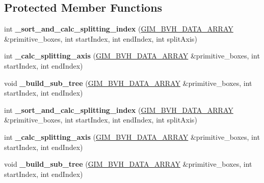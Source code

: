 \subsection*{Protected Member Functions}
\begin{DoxyCompactItemize}
\item 
\mbox{\label{classbtBvhTree_adab83b12f4b402cfb5993229464bb5bf}} 
int {\bfseries \+\_\+sort\+\_\+and\+\_\+calc\+\_\+splitting\+\_\+index} (\hyperlink{classGIM__BVH__DATA__ARRAY}{G\+I\+M\+\_\+\+B\+V\+H\+\_\+\+D\+A\+T\+A\+\_\+\+A\+R\+R\+AY} \&primitive\+\_\+boxes, int start\+Index, int end\+Index, int split\+Axis)
\item 
\mbox{\label{classbtBvhTree_a0a4c7b8aac4746d61db57943813897ae}} 
int {\bfseries \+\_\+calc\+\_\+splitting\+\_\+axis} (\hyperlink{classGIM__BVH__DATA__ARRAY}{G\+I\+M\+\_\+\+B\+V\+H\+\_\+\+D\+A\+T\+A\+\_\+\+A\+R\+R\+AY} \&primitive\+\_\+boxes, int start\+Index, int end\+Index)
\item 
\mbox{\label{classbtBvhTree_a04dbb29969ae7bdedc06d650b5f35932}} 
void {\bfseries \+\_\+build\+\_\+sub\+\_\+tree} (\hyperlink{classGIM__BVH__DATA__ARRAY}{G\+I\+M\+\_\+\+B\+V\+H\+\_\+\+D\+A\+T\+A\+\_\+\+A\+R\+R\+AY} \&primitive\+\_\+boxes, int start\+Index, int end\+Index)
\item 
\mbox{\label{classbtBvhTree_adab83b12f4b402cfb5993229464bb5bf}} 
int {\bfseries \+\_\+sort\+\_\+and\+\_\+calc\+\_\+splitting\+\_\+index} (\hyperlink{classGIM__BVH__DATA__ARRAY}{G\+I\+M\+\_\+\+B\+V\+H\+\_\+\+D\+A\+T\+A\+\_\+\+A\+R\+R\+AY} \&primitive\+\_\+boxes, int start\+Index, int end\+Index, int split\+Axis)
\item 
\mbox{\label{classbtBvhTree_a0a4c7b8aac4746d61db57943813897ae}} 
int {\bfseries \+\_\+calc\+\_\+splitting\+\_\+axis} (\hyperlink{classGIM__BVH__DATA__ARRAY}{G\+I\+M\+\_\+\+B\+V\+H\+\_\+\+D\+A\+T\+A\+\_\+\+A\+R\+R\+AY} \&primitive\+\_\+boxes, int start\+Index, int end\+Index)
\item 
\mbox{\label{classbtBvhTree_a04dbb29969ae7bdedc06d650b5f35932}} 
void {\bfseries \+\_\+build\+\_\+sub\+\_\+tree} (\hyperlink{classGIM__BVH__DATA__ARRAY}{G\+I\+M\+\_\+\+B\+V\+H\+\_\+\+D\+A\+T\+A\+\_\+\+A\+R\+R\+AY} \&primitive\+\_\+boxes, int start\+Index, int end\+Index)
\end{DoxyCompactItemize}
